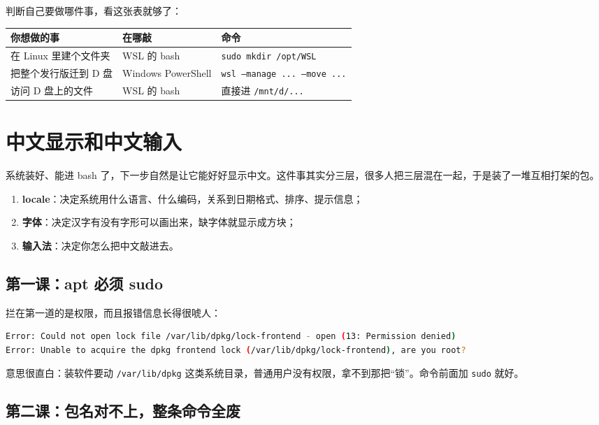 \documentclass[12pt,a4paper]{ctexbook}
\begin{document}
判断自己要做哪件事，看这张表就够了：

\begin{center}
\small
\begin{tabular}{|l|l|l|}
\hline
\textbf{你想做的事} & \textbf{在哪敲} & \textbf{命令} \\
\hline
在 Linux 里建个文件夹 & WSL 的 bash & \texttt{sudo mkdir /opt/WSL} \\
把整个发行版迁到 D 盘 & Windows PowerShell & \texttt{wsl --manage ... --move ...} \\
访问 D 盘上的文件 & WSL 的 bash & 直接进 \texttt{/mnt/d/...} \\
\hline
\end{tabular}
\end{center}

\section{中文显示和中文输入}

系统装好、能进 bash 了，下一步自然是让它能好好显示中文。这件事其实分三层，很多人把三层混在一起，于是装了一堆互相打架的包。

\begin{enumerate}
    \item \textbf{locale}：决定系统用什么语言、什么编码，关系到日期格式、排序、提示信息；
    \item \textbf{字体}：决定汉字有没有字形可以画出来，缺字体就显示成方块；
    \item \textbf{输入法}：决定你怎么把中文敲进去。
\end{enumerate}

\subsection{第一课：apt 必须 sudo}

拦在第一道的是权限，而且报错信息长得很唬人：

\begin{lstlisting}[language=bash,title={apt 的权限报错}]
Error: Could not open lock file /var/lib/dpkg/lock-frontend - open (13: Permission denied)
Error: Unable to acquire the dpkg frontend lock (/var/lib/dpkg/lock-frontend), are you root?
\end{lstlisting}

意思很直白：装软件要动 \verb|/var/lib/dpkg| 这类系统目录，普通用户没有权限，拿不到那把``锁''。命令前面加 \verb|sudo| 就好。

\subsection{第二课：包名对不上，整条命令全废}
\end{document}
